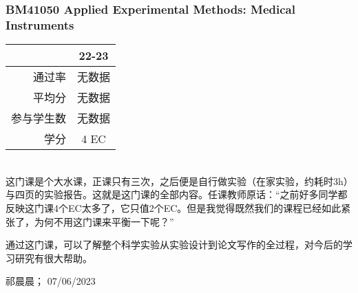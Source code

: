 \subsubsection[BM41050 Applied Experimental Methods: Medical Instruments]{BM41050 Applied Experimental Methods: Medical Instruments}
\begin{minipage}{0.45\textwidth}
\centering
{}
\end{minipage}%
\begin{minipage}{0.45\textwidth}
\raggedleft
\begin{tabular}{r|c}
\textbf{ } & \textbf{22-23} \\ \hline
通过率 & 无数据 \\ 
平均分 & 无数据 \\ 
参与学生数 & 无数据 \\
学分 & 4 EC\\
\end{tabular}
\end{minipage}\\

这门课是个大水课，正课只有三次，之后便是自行做实验（在家实验，约耗时3h）与四页的实验报告。这就是这门课的全部内容。任课教师原话：“之前好多同学都反映这门课4个EC太多了，它只值2个EC。但是我觉得既然我们的课程已经如此紧张了，为何不用这门课来平衡一下呢？”

通过这门课，可以了解整个科学实验从实验设计到论文写作的全过程，对今后的学习研究有很大帮助。
\begin{flushright}
祁晨晨； 07/06/2023
\end{flushright}

